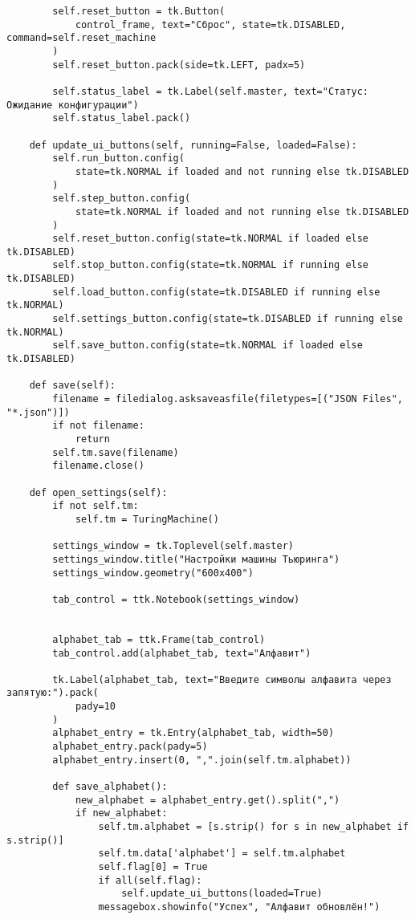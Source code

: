 \begin{lstlisting}
        self.reset_button = tk.Button(
            control_frame, text="Сброс", state=tk.DISABLED, command=self.reset_machine
        )
        self.reset_button.pack(side=tk.LEFT, padx=5)

        self.status_label = tk.Label(self.master, text="Статус: Ожидание конфигурации")
        self.status_label.pack()

    def update_ui_buttons(self, running=False, loaded=False):
        self.run_button.config(
            state=tk.NORMAL if loaded and not running else tk.DISABLED
        )
        self.step_button.config(
            state=tk.NORMAL if loaded and not running else tk.DISABLED
        )
        self.reset_button.config(state=tk.NORMAL if loaded else tk.DISABLED)
        self.stop_button.config(state=tk.NORMAL if running else tk.DISABLED)
        self.load_button.config(state=tk.DISABLED if running else tk.NORMAL)
        self.settings_button.config(state=tk.DISABLED if running else tk.NORMAL)
        self.save_button.config(state=tk.NORMAL if loaded else tk.DISABLED)

    def save(self):
        filename = filedialog.asksaveasfile(filetypes=[("JSON Files", "*.json")])
        if not filename:
            return
        self.tm.save(filename)
        filename.close()

    def open_settings(self):
        if not self.tm:
            self.tm = TuringMachine()

        settings_window = tk.Toplevel(self.master)
        settings_window.title("Настройки машины Тьюринга")
        settings_window.geometry("600x400")

        tab_control = ttk.Notebook(settings_window)


        alphabet_tab = ttk.Frame(tab_control)
        tab_control.add(alphabet_tab, text="Алфавит")

        tk.Label(alphabet_tab, text="Введите символы алфавита через запятую:").pack(
            pady=10
        )
        alphabet_entry = tk.Entry(alphabet_tab, width=50)
        alphabet_entry.pack(pady=5)
        alphabet_entry.insert(0, ",".join(self.tm.alphabet))

        def save_alphabet():
            new_alphabet = alphabet_entry.get().split(",")
            if new_alphabet:
                self.tm.alphabet = [s.strip() for s in new_alphabet if s.strip()]
                self.tm.data['alphabet'] = self.tm.alphabet
                self.flag[0] = True
                if all(self.flag):
                    self.update_ui_buttons(loaded=True)
                messagebox.showinfo("Успех", "Алфавит обновлён!")


\end{lstlisting}
